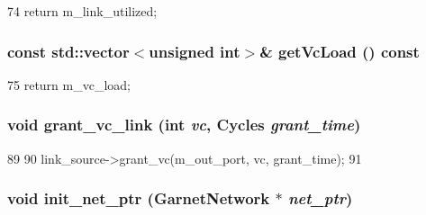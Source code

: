 \begin{DoxyCode}
74 { return m_link_utilized; }
\end{DoxyCode}
\hypertarget{classNetworkLink_ac460400c34855ef93de2d591ba56f803}{
\subsubsection[{getVcLoad}]{\setlength{\rightskip}{0pt plus 5cm}const {\bf std::vector}$<$unsigned int$>$\& getVcLoad () const}}
\label{classNetworkLink_ac460400c34855ef93de2d591ba56f803}



\begin{DoxyCode}
75 { return m_vc_load; }
\end{DoxyCode}
\hypertarget{classNetworkLink_a6617d5216f3d137e1075916883455a9c}{
\subsubsection[{grant\_\-vc\_\-link}]{\setlength{\rightskip}{0pt plus 5cm}void grant\_\-vc\_\-link (int {\em vc}, \/  {\bf Cycles} {\em grant\_\-time})}}
\label{classNetworkLink_a6617d5216f3d137e1075916883455a9c}



\begin{DoxyCode}
89 {
90     link_source->grant_vc(m_out_port, vc, grant_time);
91 }
\end{DoxyCode}
\hypertarget{classNetworkLink_ab5da6a3c41f86ad2993eb11f4894ef00}{
\subsubsection[{init\_\-net\_\-ptr}]{\setlength{\rightskip}{0pt plus 5cm}void init\_\-net\_\-ptr ({\bf GarnetNetwork} $\ast$ {\em net\_\-ptr})}}
\label{classNetworkLink_ab5da6a3c41f86ad2993eb11f4894ef00}



